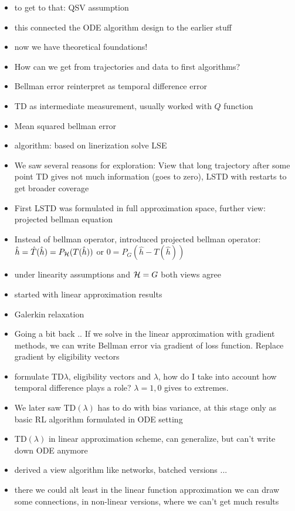 \begin{itemize}
    \item to get to that: QSV assumption
    \item this connected the ODE algorithm design to the earlier stuff
    \item now we have theoretical foundations!
    \item How can we get from trajectories and data to first algorithms?
    \item Bellman error reinterpret as temporal difference error
    \item TD as intermediate measurement, usually worked with \(Q\) function
    \item Mean squared bellman error 
    \item algorithm: based on linerization solve LSE
    \item We saw several reasons for exploration: View that long trajectory after some point TD gives not much information (goes to zero), LSTD with restarts to get broader coverage 
    \item First LSTD was formulated in full approximation space, further view: projected bellman equation 
    \item Instead of bellman operator, introduced projected bellman operator: $\hat{h}=\hat{T}(\hat{h})=P_{\mathcal{H}}(T(\hat{h}))$ or \(0=P_G(\hat{h}-T(\hat{h}))\)
    \item under linearity assumptions and $\mathcal{H}=G$ both views agree
    \item started with linear approximation results
    \item Galerkin relaxation
    \item Going a bit back .. If we solve in the linear approximation with gradient methods, we can write Bellman error via gradient of loss function. Replace gradient by eligibility vectors    
    \item formulate TD\(\lambda\), eligibility vectors and \(\lambda\), how do I take into account how temporal difference plays a role? \(\lambda=1,0\) gives to extremes.
    \item We later saw TD\((\lambda)\) has to do with bias variance, at this stage only as basic RL algorithm formulated in ODE setting 
    \item TD\((\lambda)\) in linear approximation scheme, can generalize, but can't write down ODE anymore 
    \item derived a view algorithm like networks, batched versions ... 
    \item there we could alt least in the linear function approximation we can draw some connections, in non-linear versions, where we can't get much results 

\end{itemize}
